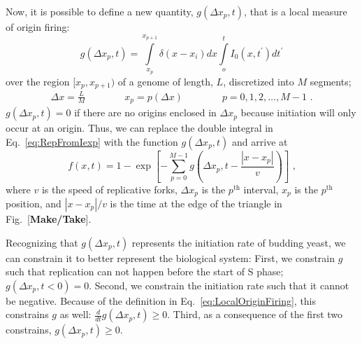 		Now, it is possible to define a new quantity, $g(\Delta x_p,t)$, that is a local measure of origin firing:
		\begin{equation} \label{eq:LocalOriginFiring}
			g\left(\Delta x_p,t\right) = \int\limits_{x_p}^{x_{p+1}}\delta\left( x-x_i\right) dx \int\limits_o^t I_0\left( x,t^\prime\right) dt^\prime
		\end{equation}
		over the region $[x_p, x_{p+1})$ of a genome of length, $L$, discretized into $M$ segments;
		\begin{align}
			\Delta x = \frac{L}{M} \qquad\qquad x_p = p\left(\Delta x\right) \qquad\qquad p = 0, 1, 2, \ldots , M-1 \text{ .}
		\end{align}
		$g(\Delta x_p,t)=0$ if there are no origins enclosed in $\Delta x_p$ because initiation will only occur at an origin.
		Thus, we can replace the double integral in Eq.~\ref{eq:RepFromIexp} with the function $g(\Delta x_p,t)$ and arrive at
		\begin{equation} \label{eq:RepFromG}
			f\left( x,t\right) = 1 - \exp\left[ - \sum\limits_{p=0}^{M-1}g\left(\Delta x_p,t-\frac{\left| x-x_p \right|}{v}\right)\right] \text{ ,}
		\end{equation}
		where $v$ is the speed of replicative forks, $\Delta x_p$ is the $p^\text{th}$ interval, $x_p$ is the $p^\text{th}$ position, and $\left| x-x_p \right|/v$ is the time at the edge of the triangle in Fig.~[\textbf{Make/Take}].
		
		Recognizing that $g(\Delta x_p,t)$ represents the initiation rate of budding yeast, we can constrain it to better represent the biological system:
		First, we constrain $g$ such that replication can not happen before the start of S phase; $g(\Delta x_p,t<0)=0$.
		Second, we constrain the initiation rate such that it cannot be negative. Because of the definition in Eq.~\ref{eq:LocalOriginFiring}, this constrains $g$ as well: $\frac{d}{dt}g(\Delta x_p,t)\geq 0$.
		Third, as a consequence of the first two constrains, $g(\Delta x_p,t)\geq 0$.
		
